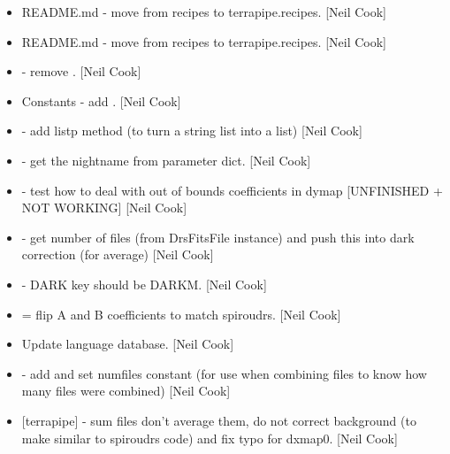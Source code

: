 \documentclass[a4paper,10pt,english]{report}
\begin{document}
\label{\detokenize{misc/changelog:id106}}\begin{itemize}
\item {} 
README.md - move from recipes to terrapipe.recipes. {[}Neil Cook{]}

\item {} 
README.md - move from recipes to terrapipe.recipes. {[}Neil Cook{]}

\item {} 
 - remove . {[}Neil Cook{]}

\item {} 
Constants - add . {[}Neil Cook{]}

\item {} 
 - add listp method (to turn a string list into a
list) {[}Neil Cook{]}

\item {} 
 - get the nightname from parameter dict. {[}Neil
Cook{]}

\item {} 
 - test how to deal with out of bounds
coefficients in dymap {[}UNFINISHED + NOT WORKING{]} {[}Neil Cook{]}

\item {} 
 - get number of files (from DrsFitsFile
instance) and push this into dark correction (for average) {[}Neil Cook{]}

\item {} 
 - DARK key should be DARKM. {[}Neil Cook{]}

\item {} 
 = flip A and B coefficients to
match spiroudrs. {[}Neil Cook{]}

\item {} 
Update language database. {[}Neil Cook{]}

\item {} 
 - add and set numfiles constant (for use when combining
files to know how many files were combined) {[}Neil Cook{]}

\item {} 
 {[}terrapipe{]} - sum files don’t average them,
do not correct background (to make similar to spiroudrs code) and fix
typo for dxmap0. {[}Neil Cook{]}


\end{itemize}
\end{document}
